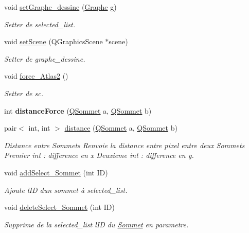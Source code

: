 \begin{DoxyCompactItemize}
void \hyperlink{classQZoneDeDessin_a3700227fbb8df7218f487a0b8e311c0e}{set\+Graphe\+\_\+dessine} (\hyperlink{classGraphe}{Graphe} g)
\begin{DoxyCompactList}\small\item\em Setter de selected\+\_\+list. \end{DoxyCompactList}\item 
\mbox{\label{classQZoneDeDessin_a4a699941897941a4d627e50dfffe92d4}} 
void \hyperlink{classQZoneDeDessin_a4a699941897941a4d627e50dfffe92d4}{set\+Scene} (Q\+Graphics\+Scene $\ast$scene)
\begin{DoxyCompactList}\small\item\em Setter de graphe\+\_\+dessine. \end{DoxyCompactList}\item 
void \hyperlink{classQZoneDeDessin_a2fddc0b3c49fa5eb08cf57a325edad0e}{force\+\_\+\+Atlas2} ()
\begin{DoxyCompactList}\small\item\em Setter de sc. \end{DoxyCompactList}\item 
\mbox{\label{classQZoneDeDessin_af9043c987805444d2490d8871c5d124c}} 
int {\bfseries distance\+Force} (\hyperlink{classQSommet}{Q\+Sommet} a, \hyperlink{classQSommet}{Q\+Sommet} b)
\item 
pair$<$ int, int $>$ \hyperlink{classQZoneDeDessin_a49a3ae3e70f178cb511b1759e0f27778}{distance} (\hyperlink{classQSommet}{Q\+Sommet} a, \hyperlink{classQSommet}{Q\+Sommet} b)
\begin{DoxyCompactList}\small\item\em Distance entre Sommets Renvoie la distance entre pixel entre deux Sommets Premier int \+: difference en x Deuxieme int \+: difference en y. \end{DoxyCompactList}\item 
void \hyperlink{classQZoneDeDessin_a92f0d082808add86596dbab5955cc8f4}{add\+Select\+\_\+\+Sommet} (int ID)
\begin{DoxyCompactList}\small\item\em Ajoute l\textquotesingle{}ID d\textquotesingle{}un sommet \`{a} selected\+\_\+list. \end{DoxyCompactList}\item 
void \hyperlink{classQZoneDeDessin_ac611d0d33fd0f84494c0e57a4a476da1}{delete\+Select\+\_\+\+Sommet} (int ID)
\begin{DoxyCompactList}\small\item\em Supprime de la selected\+\_\+list l\textquotesingle{}ID du \hyperlink{classSommet}{Sommet} en parametre. \end{DoxyCompactList}\item 

\end{DoxyCompactItemize}
